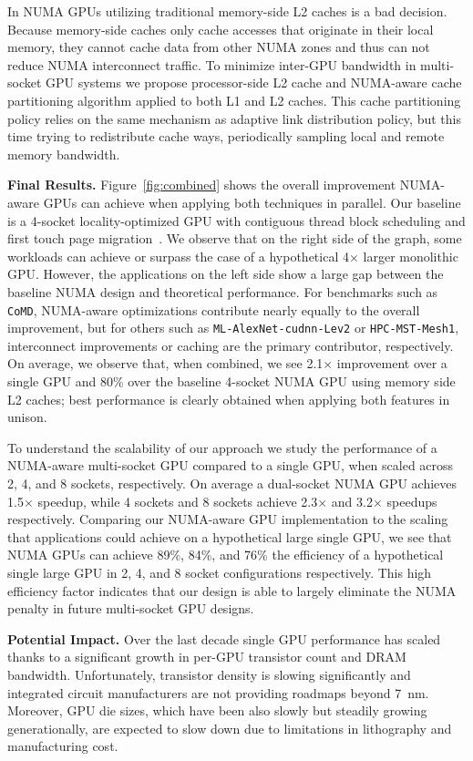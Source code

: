 \documentclass{sig-alternate}
\begin{document}
In NUMA GPUs utilizing traditional memory-side L2 caches is a bad decision. Because memory-side caches only cache accesses that originate in their local memory, they cannot cache data from other NUMA zones and thus can
not reduce NUMA interconnect traffic. To minimize inter-GPU bandwidth in multi-socket GPU systems we propose processor-side L2 cache and NUMA-aware cache partitioning algorithm applied to both L1 and L2 caches. This cache partitioning policy relies on the same mechanism as adaptive link distribution policy, but this time trying to redistribute cache ways, periodically sampling local and remote memory bandwidth.


\textbf{Final Results. }Figure~\ref{fig:combined} shows the overall improvement NUMA-aware GPUs can achieve when applying both techniques in parallel. Our baseline is a 4-socket locality-optimized GPU with contiguous thread block scheduling and first touch page migration~\cite{Arunkumar2017}. We observe that on the right side of the graph, some workloads can achieve or surpass the case of a hypothetical 4$\times$ larger monolithic GPU. However, the applications on the left side show a large gap between the baseline NUMA design and theoretical performance. For benchmarks such as \texttt{CoMD}, NUMA-aware optimizations contribute nearly equally to the overall improvement, but for others such as \texttt{ML-AlexNet-cudnn-Lev2} or \texttt{HPC-MST-Mesh1}, interconnect improvements or caching are the primary contributor, respectively. On average, we observe that, when combined, we see
2.1$\times$ improvement over a single GPU and 80\% over the baseline 4-socket NUMA GPU using memory side L2 caches; best performance is clearly obtained when applying both features in unison.

To understand the scalability of our approach we study the performance of a NUMA-aware multi-socket GPU compared to a single GPU, when scaled across 2, 4, and 8 sockets, respectively. On average a dual-socket NUMA GPU achieves
1.5$\times$ speedup, while 4 sockets and 8 sockets achieve 2.3$\times$ and 3.2$\times$ speedups respectively. Comparing our NUMA-aware GPU implementation to the scaling that applications could achieve on a hypothetical large single GPU, we see that NUMA GPUs can achieve 89\%, 84\%, and 76\% the efficiency of a hypothetical single large GPU in 2, 4, and 8 socket configurations respectively. This high efficiency factor indicates that our design is able to largely
eliminate the NUMA penalty in future multi-socket GPU designs.


\textbf{Potential Impact.} Over the last decade single GPU performance has scaled thanks to a significant growth in per-GPU transistor count and DRAM bandwidth. Unfortunately, transistor density is slowing significantly and integrated circuit manufacturers are not providing roadmaps beyond \SI{7}{nm}. Moreover, GPU die sizes, which have been also slowly but steadily growing generationally, are expected to slow down due to limitations in lithography and manufacturing cost.
\end{document}
